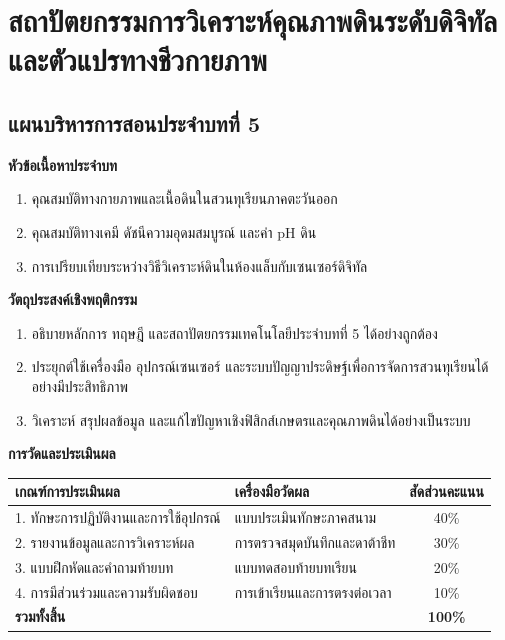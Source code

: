 \chapter{สถาปัตยกรรมการวิเคราะห์คุณภาพดินระดับดิจิทัลและตัวแปรทางชีวกายภาพ}
\label{chap:ch05}

\section*{แผนบริหารการสอนประจำบทที่ 5}

\noindent\textbf{หัวข้อเนื้อหาประจำบท}
\begin{enumerate}
    \item คุณสมบัติทางกายภาพและเนื้อดินในสวนทุเรียนภาคตะวันออก
    \item คุณสมบัติทางเคมี ดัชนีความอุดมสมบูรณ์ และค่า pH ดิน
    \item การเปรียบเทียบระหว่างวิธีวิเคราะห์ดินในห้องแล็บกับเซนเซอร์ดิจิทัล
\end{enumerate}

\noindent\textbf{วัตถุประสงค์เชิงพฤติกรรม}
\begin{enumerate}
    \item อธิบายหลักการ ทฤษฎี และสถาปัตยกรรมเทคโนโลยีประจำบทที่ 5 ได้อย่างถูกต้อง
    \item ประยุกต์ใช้เครื่องมือ อุปกรณ์เซนเซอร์ และระบบปัญญาประดิษฐ์เพื่อการจัดการสวนทุเรียนได้อย่างมีประสิทธิภาพ
    \item วิเคราะห์ สรุปผลข้อมูล และแก้ไขปัญหาเชิงฟิสิกส์เกษตรและคุณภาพดินได้อย่างเป็นระบบ
\end{enumerate}

\noindent\textbf{การวัดและประเมินผล}
\begin{table}[H]
\centering\small
\begin{tabularx}{\textwidth}{p{} p{} c}
\toprule
\textbf{เกณฑ์การประเมินผล} & \textbf{เครื่องมือวัดผล} & \textbf{สัดส่วนคะแนน} \\
\midrule
1. ทักษะการปฏิบัติงานและการใช้อุปกรณ์ & แบบประเมินทักษะภาคสนาม & 40\% \\
2. รายงานข้อมูลและการวิเคราะห์ผล & การตรวจสมุดบันทึกและดาต้าชีท & 30\% \\
3. แบบฝึกหัดและคำถามท้ายบท & แบบทดสอบท้ายบทเรียน & 20\% \\
4. การมีส่วนร่วมและความรับผิดชอบ & การเข้าเรียนและการตรงต่อเวลา & 10\% \\
\midrule
\textbf{รวมทั้งสิ้น} & & \textbf{100\%} \\
\bottomrule
\end{tabularx}
\end{table}
\newpage

